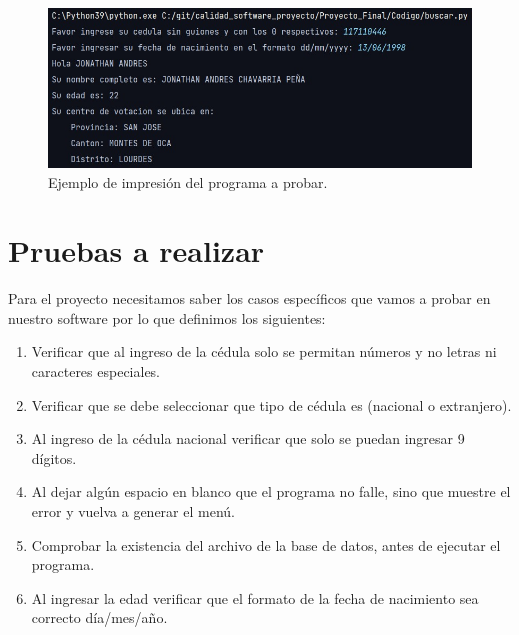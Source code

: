 \documentclass[conference]{IEEEtran}
\begin{document}
\begin{figure}[H]
\centering
\includegraphics[scale=0.35]{imagenes/ejemplo_programa_a_probar.jpeg}
\caption{Ejemplo de impresión del programa a probar.}
\end{figure}


\section{Pruebas a realizar}

Para el proyecto necesitamos saber los casos específicos que vamos a probar en nuestro software por lo que definimos los siguientes:

\begin{enumerate}

\item Verificar que al ingreso de la cédula solo se permitan números y no letras ni caracteres especiales.

\item Verificar que se debe seleccionar que tipo de cédula es (nacional o extranjero).

\item Al ingreso de la cédula nacional verificar que solo se puedan ingresar 9 dígitos.

\item Al dejar algún espacio en blanco que el programa no falle, sino que muestre el error y vuelva a generar el menú.

\item Comprobar la existencia del archivo de la base de datos, antes de ejecutar el programa.

\item Al ingresar la edad verificar que el formato de la fecha de nacimiento sea correcto día/mes/año.

\end{enumerate}



\end{document}
